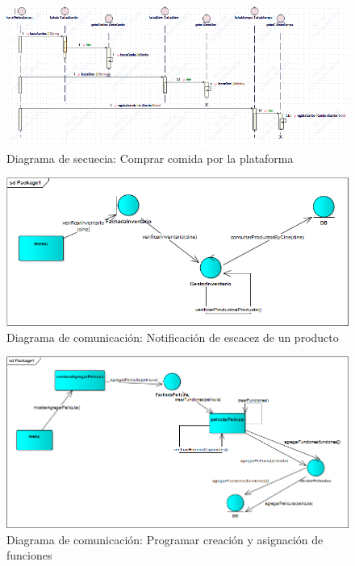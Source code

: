 \begin{figure}[h!]
\centering
\includegraphics[width=1\linewidth]{diseno/requerimientos/imgs/CompraCombosSec}
	\caption{Diagrama de secuecia: Comprar comida por la plataforma}
\end{figure}




\begin{figure}[h!]
\centering
\includegraphics[width=1\linewidth]{diseno/requerimientos/imgs/EscacezCom}
	\caption{Diagrama de comunicación: Notificación de escacez de un producto}
\end{figure}


\begin{figure}[h!]
\centering
\includegraphics[width=1\linewidth]{diseno/requerimientos/imgs/FuncionesCom}
	\caption{Diagrama de comunicación: Programar creación y asignación de funciones}
\end{figure}

